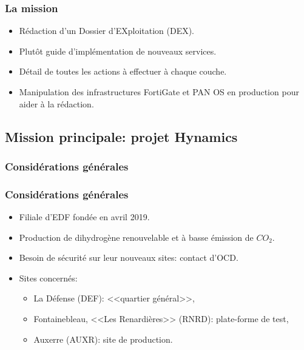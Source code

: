 \documentclass[french, a4paper]{beamer}
\begin{document}
\begin{frame}
    \frametitle{La mission}
    \begin{itemize}
        \item Rédaction d'un Dossier d'EXploitation (DEX).
        \item Plutôt guide d'implémentation de nouveaux services.
        \item Détail de toutes les actions à effectuer à chaque couche.
        \item Manipulation des infrastructures FortiGate et PAN OS en production
            pour aider à la rédaction.
    \end{itemize}
\end{frame}

\subsection{Mission principale: projet Hynamics}
\subsubsection{Considérations générales}

\begin{frame}
    \frametitle{Considérations générales}
    \begin{itemize}
        \item Filiale d'EDF fondée en avril 2019.
        \item Production de dihydrogène renouvelable et à basse émission de
            $CO_2$.
        \item Besoin de sécurité sur leur nouveaux sites: contact d'OCD\@.
        \item Sites concernés:
        \begin{itemize}
            \item La Défense (DEF): <<quartier général>>,
            \item Fontainebleau, <<Les Renardières>> (RNRD): plate-forme de
                test,
            \item Auxerre (AUXR): site de production.
        \end{itemize}
    \end{itemize}
\end{frame}
\end{document}
